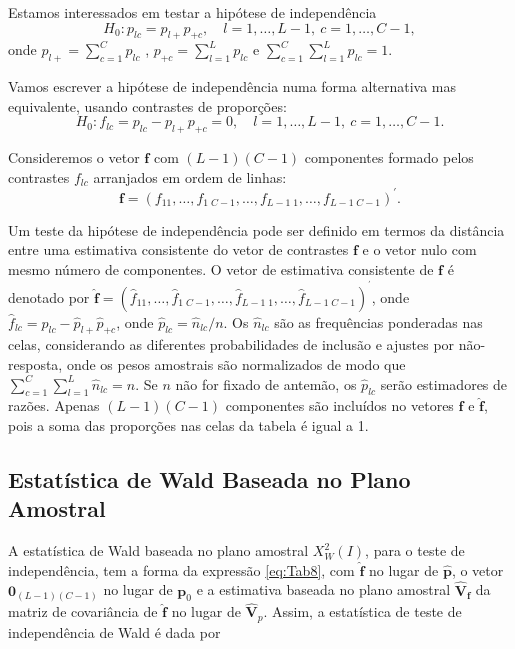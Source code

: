 \documentclass[]{book}
\theoremstyle{definition}
\theoremstyle{definition}
\theoremstyle{definition}
\theoremstyle{remark}
\begin{document}
Estamos interessados em testar a hipótese de independência \[
H_{0}:p_{lc}=p_{l+}p_{+c},\quad l=1,\ldots ,L-1,\ c=1,\ldots,C-1, 
\] onde \(p_{l+}=\sum_{c=1}^{C}p_{lc}\) ,
\(p_{+c}=\sum_{l=1}^{L}p_{lc}\) e
\(\sum_{c=1}^{C}\sum_{l=1}^{L}p_{lc}=1\).

Vamos escrever a hipótese de independência numa forma alternativa mas
equivalente, usando contrastes de proporções: \[
H_{0}:f_{lc}=p_{lc}-p_{l+}p_{+c}=0,\quad l=1,\ldots ,L-1,\ c=1,\ldots
,C-1.
\]

Consideremos o vetor \(\mathbf{f}\) com
\(\left( L-1\right) \left( C-1\right)\) componentes formado pelos
contrastes \(f_{lc}\) arranjados em ordem de linhas: \[
\mathbf{f}=\left( f_{11},\ldots ,f_{1\;C-1},\ldots ,f_{L-1\;1},\ldots
,f_{L-1\;C-1}\right) ^{\prime }. 
\]

Um teste da hipótese de independência pode ser definido em termos da
distância entre uma estimativa consistente do vetor de contrastes
\(\mathbf{f}\) e o vetor nulo com mesmo número de componentes. O vetor
de estimativa consistente de \(\mathbf{f}\) é denotado por
\(\mathbf{\hat{f}}=\left( \hat{f}_{11},\ldots ,\hat{f}_{1\;C-1},\ldots ,\hat{f} _{L-1\;1},\ldots ,\hat{f}_{L-1\;C-1}\right) ^{^{\prime }}\),
onde \(\hat{f} _{lc}=\hat{p}_{lc}-\hat{p}_{l+}\hat{p}_{+c}\), onde
\(\hat{p}_{lc}=\hat{n} _{lc}/n\). Os \(\hat{n}_{lc}\) são as frequências
ponderadas nas celas, considerando as diferentes probabilidades de
inclusão e ajustes por não-resposta, onde os pesos amostrais são
normalizados de modo que \(\sum_{c=1}^{C}\sum_{l=1}^{L}\hat{n}_{lc}=n\).
Se \(n\) não for fixado de antemão, os \(\hat{p}_{lc}\) serão
estimadores de razões. Apenas \(\left( L-1\right) \left( C-1\right)\)
componentes são incluídos no vetores \(\mathbf{f}\) e
\(\mathbf{\hat{f}}\), pois a soma das proporções nas celas da tabela é
igual a 1.

\subsection{Estatística de Wald Baseada no Plano
Amostral}\label{estatistica-de-wald-baseada-no-plano-amostral-1}

A estatística de Wald baseada no plano amostral
\(X_{W}^{2}\left(I\right)\), para o teste de independência, tem a forma
da expressão \eqref{eq:Tab8}, com \(\mathbf{\hat{f}}\) no lugar de
\(\mathbf{\hat{p}}\), o vetor
\(\mathbf{0}_{\left( L-1\right)\left( C-1\right)}\) no lugar de
\(\mathbf{p}_{0}\) e a estimativa baseada no plano amostral
\(\mathbf{\hat{V}}_{\mathbf{f}}\) da matriz de covariância de
\(\mathbf{\hat{f}}\) no lugar de \(\mathbf{ \hat{V}}_{p}\). Assim, a
estatística de teste de independência de Wald é dada por
\end{document}
